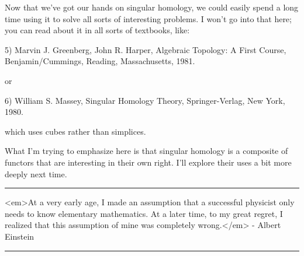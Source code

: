 Now that we've got our hands on singular homology, we could easily spend
a long time using it to solve all sorts of interesting problems.  I
won't go into that here; you can read about it in all sorts of
textbooks, like:

5) Marvin J. Greenberg, John R. Harper, Algebraic Topology: A First Course,
Benjamin/Cummings, Reading, Massachusetts, 1981.

or

6) William S. Massey, Singular Homology Theory, Springer-Verlag, New York,
1980.

which uses cubes rather than simplices.  

What I'm trying to emphasize here is that singular homology is a
composite of functors that are interesting in their own right.  I'll
explore their uses a bit more deeply next time.



 \par\noindent\rule{\textwidth}{0.4pt}
<em>At a very early age, I made an assumption that a successful
physicist only needs to know elementary mathematics.  At a later time,
to my great regret, I realized that this assumption of mine was
completely wrong.</em> - Albert Einstein






 \par\noindent\rule{\textwidth}{0.4pt}

